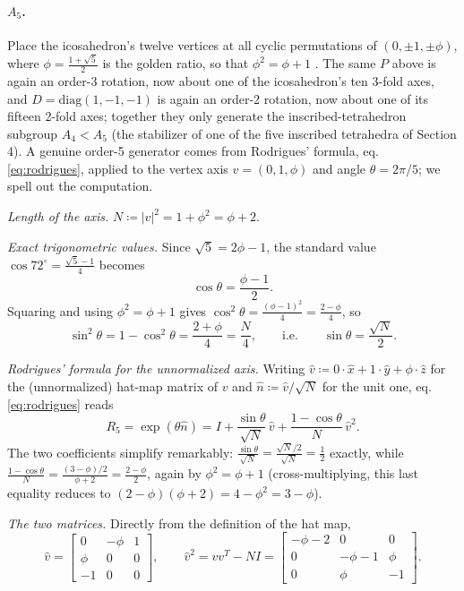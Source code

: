 \documentclass{amsart}
\theoremstyle{plain}
\theoremstyle{definition}
\begin{document}
\paragraph{$A_5$.} Place the icosahedron's twelve vertices at all cyclic permutations of $(0,\pm1,\pm\phi)$, where $\phi=\tfrac{1+\sqrt5}{2}$ is the golden ratio, so that $\phi^2=\phi+1$ \cite{coxeter1973}. The same $P$ above is again an order-3 rotation, now about one of the icosahedron's ten 3-fold axes, and $D=\mathrm{diag}(1,-1,-1)$ is again an order-2 rotation, now about one of its fifteen 2-fold axes; together they only generate the inscribed-tetrahedron subgroup $A_4<A_5$ (the stabilizer of one of the five inscribed tetrahedra of Section 4). A genuine order-5 generator comes from Rodrigues' formula, eq. \ref{eq:rodrigues}, applied to the vertex axis $v=(0,1,\phi)$ and angle $\theta=2\pi/5$; we spell out the computation.

\emph{Length of the axis.} $N\coloneqq|v|^2=1+\phi^2=\phi+2$.

\emph{Exact trigonometric values.} Since $\sqrt5=2\phi-1$, the standard value $\cos72^\circ=\tfrac{\sqrt5-1}{4}$ becomes
\begin{equation*}
    \cos\theta=\frac{\phi-1}{2}.
\end{equation*}
Squaring and using $\phi^2=\phi+1$ gives $\cos^2\theta=\tfrac{(\phi-1)^2}{4}=\tfrac{2-\phi}{4}$, so
\begin{equation*}
    \sin^2\theta = 1-\cos^2\theta = \frac{2+\phi}{4}=\frac{N}{4}, \qquad\text{i.e.}\qquad \sin\theta=\frac{\sqrt N}{2}.
\end{equation*}

\emph{Rodrigues' formula for the unnormalized axis.} Writing $\hat v\coloneqq 0\cdot\hat x+1\cdot\hat y+\phi\cdot\hat z$ for the (unnormalized) hat-map matrix of $v$ and $\hat n\coloneqq\hat v/\sqrt N$ for the unit one, eq. \ref{eq:rodrigues} reads
\begin{equation*}
    R_5=\exp(\theta\hat n) = I + \frac{\sin\theta}{\sqrt N}\,\hat v + \frac{1-\cos\theta}{N}\,\hat v^2.
\end{equation*}
The two coefficients simplify remarkably: $\frac{\sin\theta}{\sqrt N}=\frac{\sqrt N/2}{\sqrt N}=\frac12$ exactly, while $\frac{1-\cos\theta}{N}=\frac{(3-\phi)/2}{\phi+2}=\frac{2-\phi}{2}$, again by $\phi^2=\phi+1$ (cross-multiplying, this last equality reduces to $(2-\phi)(\phi+2)=4-\phi^2=3-\phi$).

\emph{The two matrices.} Directly from the definition of the hat map,
\begin{equation*}
    \hat v = \begin{bmatrix}0&-\phi&1\\\phi&0&0\\-1&0&0\end{bmatrix}, \qquad
    \hat v^2 = vv^T-NI=\begin{bmatrix}-\phi-2&0&0\\0&-\phi-1&\phi\\0&\phi&-1\end{bmatrix}.
\end{equation*}
\end{document}

